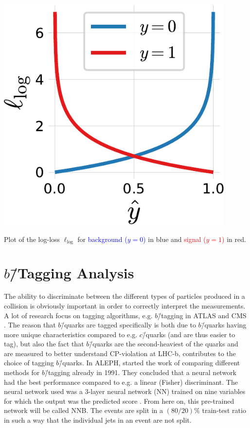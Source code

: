 \begin{marginfigure}[-5cm]
  \includegraphics[draft=false, width=0.9\textwidth]{figures/log_loss_cross_entropy/logloss.pdf}
  \caption[Plot of the Log-Loss $\ell_\mathrm{log}$]
          {Plot of the log-loss $\ell_\mathrm{log}$ for \textcolor{blue}{background ($y=0$)} in blue and \textcolor{red}{signal ($y=1$)} in red.} 
  \label{fig:q:logloss}
\end{marginfigure}

\FloatBarrier
\section[b-Tagging Analysis]{$b$\=/Tagging Analysis}
\label{sec:q:b_tagging_analysis}

The ability to discriminate between the different types of particles produced in a collision is obviously important in order to correctly interpret the measurements. A lot of research focus on tagging algorithms, e.g. $b$\=/tagging in ATLAS and CMS \autocite{scodellaroTaggingATLASCMS2017}. The reason that $b$\=/quarks are tagged specifically is both due to $b$\=/quarks having more unique characteristics compared to e.g. $c$\=/quarks (and are thus easier to tag), but also the fact that $b$\=/quarks are the second-heaviest of the quarks and are measured to better understand CP-violation at LHC-b, contributes to the choice of tagging $b$\=/quarks. In ALEPH, \citet{proriolTAGGINGQUARKEVENTS1991} started the work of comparing different methods for $b$\=/tagging already in \num{1991}. They concluded that a neural network had the best performance compared to e.g. a linear (Fisher) discriminant. The neural network used was a 3-layer neural network (NN) trained on nine variables for which the output was the predicted score . From here on, this pre-trained network will be called NNB. The events are split in a $(80/20)\si{\percent}$ train-test ratio in such a way that the individual jets in an event are not split. 


